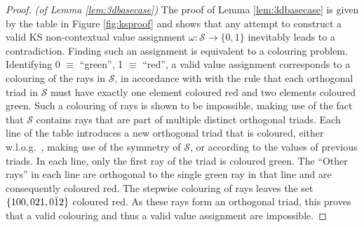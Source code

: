 \begin{proof} \emph{(of Lemma \ref{lem:3dbasecase})}\hfil\break
The proof of Lemma \ref{lem:3dbasecase} is given by the table in Figure \ref{fig:ksproof} and shows that any attempt to construct a valid KS non-contextual value assignment $\omega:\mathbb{\mathcal{S}\rightarrow}\{0,1\}$ inevitably leads to a contradiction. Finding such an assignment is equivalent to a colouring problem. Identifying 0 $\equiv$ ``green'', 1 $\equiv$ ``red'', a valid value assignment corresponds to a colouring of the rays in $\mathcal{S}$, in accordance with with the rule that each orthogonal triad in $\mathcal{S}$ must have exactly one element coloured red and two elements coloured green. Such a colouring of rays is shown to be impossible, making use of the fact that $\mathcal{S}$ contains rays that are part of multiple distinct orthogonal triads. Each line of the table introduces a new orthogonal triad that is coloured, either w.l.o.g.\ , making use of the symmetry of $\mathcal{S}$, or according to the values of previous triads. In each line, only the first ray of the triad is coloured green. The “Other rays” in each line are orthogonal to the single green ray in that line and are consequently coloured red. The stepwise colouring of rays leaves the set $\{100,021,0\text{\ensuremath{\bar{1}}2}\}$ coloured red. As these rays form an orthogonal triad, this proves that a valid colouring and thus a valid value assignment are impossible.
\end{proof}


